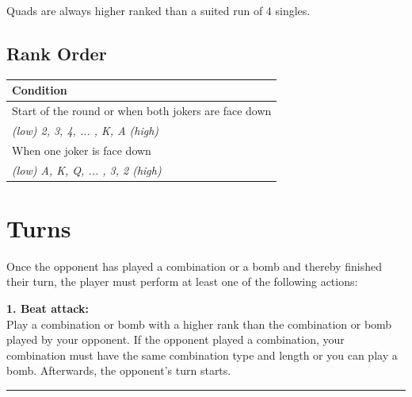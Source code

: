 \documentclass[11pt,a4paper]{article}
\begin{document}
Quads are always higher ranked than a suited run of 4 singles.

\subsection{Rank Order}

\begin{tabular}{@{}p{\columnwidth}@{}}
\toprule
\textbf{Condition} \\
\midrule
Start of the round or when both jokers are face down \\
\textit{(low) 2, 3, 4, ... , K, A (high)} \\
\midrule
When one joker is face down \\
\textit{(low) A, K, Q, ... , 3, 2 (high)} \\
\bottomrule
\end{tabular}

\section{Turns}

Once the opponent has played a combination or a bomb and thereby finished their turn, the player must perform at least one of the following actions:

\bigskip

\noindent\faBolt\quad \textbf{1. Beat attack:}\\[0.3em]
Play a combination or bomb with a higher rank than the combination or bomb played by your opponent. If the opponent played a combination, your combination must have the same combination type and length or you can play a bomb. Afterwards, the opponent's turn starts.

\bigskip
\noindent\rule{0.3\columnwidth}{0.2pt}
\bigskip
\end{document}
